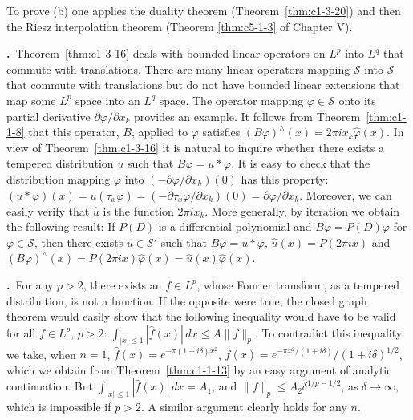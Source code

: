 To prove (b) one applies the duality theorem (Theorem~\ref{thm:c1-3-20}) and
then the Riesz interpolation theorem (Theorem \ref{thm:c5-1-3} of Chapter V).

\label{eq:c1-4-12}\textbf{\theequation.}~Theorem~\ref{thm:c1-3-16}
deals with bounded linear operators on $L^{p}$ into $L^{q}$ that commute with
translations. There are many linear operators mapping $\mathscr{S}$ into
$\mathscr{S}$ that commute with translations but do not have bounded linear
extensions that map some $L^{p}$ space into an $L^{q}$ space. The operator
mapping $\varphi \in \mathscr{S}$ onto its partial derivative
$\partial\varphi/\partial x_{k}$ provides an example. It follows from
Theorem~\ref{thm:c1-1-8} that this operator, $B$, applied to $\varphi$
satisfies $(B\varphi)^{\wedge}(x) = 2\pi i x_{k}\hat{\varphi}(x)$. In view of
Theorem~\ref{thm:c1-3-16} it is natural to inquire whether there exists a
tempered distribution $u$ such that $B\varphi = u * \varphi$. It is easy to
check that the distribution mapping $\varphi$ into
$(-\partial\varphi/\partial x_{k})(0)$ has this property:
$(u * \varphi)(x) = u(\tau_{x}\tilde{\varphi}) = (-\partial\tau_{x}\tilde{\varphi}/\partial x_{k})(0) = \partial\varphi/\partial x_{k}$.
Moreover, we can easily verify that $\hat{u}$ is the function $2\pi i x_{k}$.
More generally, by iteration we obtain the following result: If $P(D)$ is a
differential polynomial and $B\varphi = P(D)\varphi$ for
$\varphi \in \mathscr{S}$, then there exists $u \in \mathscr{S}'$ such that
$B\varphi = u * \varphi$, $\hat{u}(x) = P(2\pi ix)$ and
$(B\varphi)^{\wedge}(x) = P(2\pi ix)\hat{\varphi}(x) = \hat{u}(x)\hat{\varphi}(x)$.

\label{eq:c1-4-13}\textbf{\theequation.}~For any
$p > 2$, there exists an $f \in L^{p}$, whose Fourier transform, as a tempered
distribution, is not a function. If the opposite were true, the closed graph
theorem would easily show that the following inequality would have to be valid
for all $f \in L^{p}$, $p > 2$:
$\int_{|x| \leq 1} |\hat{f}(x)| \, dx \leq A\|f\|_{p}$. To contradict this
inequality we take, when $n = 1$, $\hat{f}(x) = e^{-\pi(1 + i\delta)x^{2}}$,
$f(x) = e^{-\pi x^{2}/(1 + i\delta)}/(1 + i\delta)^{1/2}$, which we obtain from
Theorem~\ref{thm:c1-1-13} by an easy argument of analytic continuation. But
$\int_{|x| \leq 1} |\hat{f}(x)| \, dx = A_{1}$, and
$\|f\|_{p} \leq A_{2}\delta^{1/p - 1/2}$, as $\delta \to \infty$, which is
impossible if $p > 2$. A similar argument clearly holds for any $n$.

